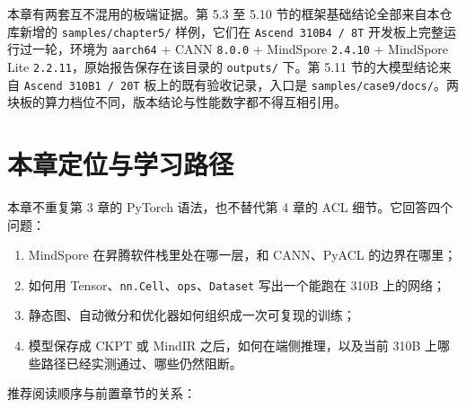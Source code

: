 本章有两套互不混用的板端证据。第 5.3 至 5.10
节的框架基础结论全部来自本仓库新增的
\passthrough{\lstinline!samples/chapter5/!} 样例，它们在
\passthrough{\lstinline!Ascend 310B4 / 8T!}
开发板上完整运行过一轮，环境为 \passthrough{\lstinline!aarch64!} + CANN
\passthrough{\lstinline!8.0.0!} + MindSpore
\passthrough{\lstinline!2.4.10!} + MindSpore Lite
\passthrough{\lstinline!2.2.11!}，原始报告保存在该目录的
\passthrough{\lstinline!outputs/!} 下。第 5.11 节的大模型结论来自
\passthrough{\lstinline!Ascend 310B1 / 20T!} 板上的既有验收记录，入口是
\passthrough{\lstinline!samples/case9/docs/!}。两块板的算力档位不同，版本结论与性能数字都不得互相引用。

\section{本章定位与学习路径}\label{src-book-chapter5-h1}

本章不重复第 3 章的 PyTorch 语法，也不替代第 4 章的 ACL
细节。它回答四个问题：

\begin{enumerate}
\def\labelenumi{\arabic{enumi}.}
\tightlist
\item
  MindSpore 在昇腾软件栈里处在哪一层，和 CANN、PyACL 的边界在哪里；
\item
  如何用
  Tensor、\passthrough{\lstinline!nn.Cell!}、\passthrough{\lstinline!ops!}、\passthrough{\lstinline!Dataset!}
  写出一个能跑在 310B 上的网络；
\item
  静态图、自动微分和优化器如何组织成一次可复现的训练；
\item
  模型保存成 CKPT 或 MindIR 之后，如何在端侧推理，以及当前 310B
  上哪些路径已经实测通过、哪些仍然阻断。
\end{enumerate}

推荐阅读顺序与前置章节的关系：

